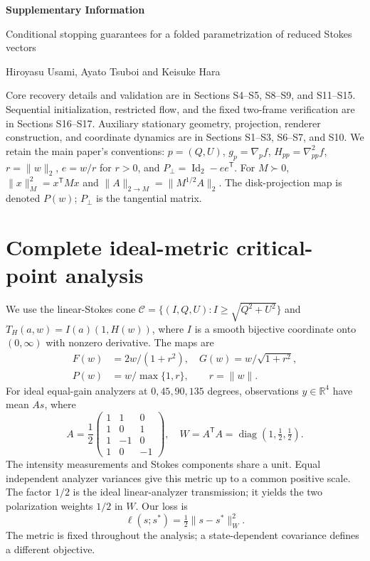 \documentclass[10pt,a4paper]{article}
\begin{document}
\raggedright
\begin{center}
{\Large\bfseries Supplementary Information}\par\medskip
{\large Conditional stopping guarantees for a folded parametrization of reduced Stokes vectors}\par\medskip
Hiroyasu Usami, Ayato Tsuboi and Keisuke Hara
\end{center}
\medskip
\noindent Core recovery details and validation are in Sections S4--S5, S8--S9, and S11--S15. Sequential initialization, restricted flow, and the fixed two-frame verification are in Sections S16--S17. Auxiliary stationary geometry, projection, renderer construction, and coordinate dynamics are in Sections S1--S3, S6--S7, and S10. We retain the main paper's conventions: $p=(Q,U)$, $g_p=\nabla_p f$, $H_{pp}=\nabla^2_{pp}f$, $r=\|w\|_2$, $e=w/r$ for $r>0$, and $P_\perp=\operatorname{Id}_2-ee^{\mathsf T}$. For $M\succ0$, $\|x\|_M^2=x^{\mathsf T}Mx$ and $\|A\|_{2\to M}=\|M^{1/2}A\|_2$. The disk-projection map is denoted $P(w)$; $P_\perp$ is the tangential matrix.

\section{Complete ideal-metric critical-point analysis}
\label{sec:ideal}
We use the linear-Stokes cone $\mathcal C=\{(I,Q,U):I\geq\sqrt{Q^2+U^2}\}$ and $T_H(a,w)=I(a)(1,H(w))$, where $I$ is a smooth bijective coordinate onto $(0,\infty)$ with nonzero derivative. The maps are
\begin{equation}
 \begin{aligned}
 F(w)&=2w/(1+r^2),\quad G(w)=w/\sqrt{1+r^2},\\
 P(w)&=w/\max\{1,r\},\qquad r=\|w\|.
 \end{aligned}
\end{equation}
For ideal equal-gain analyzers at $0,45,90,135$ degrees, observations $y\in\mathbb R^4$ have mean $As$, where
\begin{equation}
 A=\frac12\begin{pmatrix}1&1&0\\1&0&1\\1&-1&0\\1&0&-1\end{pmatrix},
 \quad W=A^\mathsf TA=\operatorname{diag}(1,\tfrac12,\tfrac12).
 \label{eq:analyzer}
\end{equation}
The intensity measurements and Stokes components share a unit. Equal independent analyzer variances give this metric up to a common positive scale. The factor $1/2$ is the ideal linear-analyzer transmission; it yields the two polarization weights $1/2$ in $W$. Our loss is
\begin{equation}
 \ell(s;s^*)=\tfrac12\|s-s^*\|_W^2.
 \label{eq:loss}
\end{equation}
The metric is fixed throughout the analysis; a state-dependent covariance defines a different objective.
\end{document}
